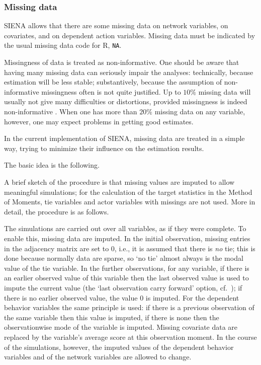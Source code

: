 \documentclass[a4paper,fleqn,11pt]{article}
\newcommand{\+}{\, + \,}
\newcommand{\Rn}{{\sf R}}
\newcommand{\SI}{{\sf SIENA }}
\newcommand{\si}{{\sf SIENA}}
\begin{document}
\subsubsection{Missing data}
\label{S_missing}

\SI allows that there are some missing data on network variables,
on covariates, and on dependent action
variables.  Missing data must be indicated by
the usual missing data code for \Rn, \texttt{NA}.

Missingness of data is treated as non-informative.
One should be aware that having many missing data can seriously
impair the analyses: technically, because estimation will be
less stable; substantively, because the assumption of
non-informative missingness often is not quite justified.
Up to $10\%$ missing data will usually not give many difficulties
or distortions, provided missingness is indeed non-informative
\citep{HuismanSteglich08}.
When one has more than $20\%$ missing data on any variable, however,
one may expect problems in getting good estimates.

In the current implementation of \si, missing data are treated in
a simple way, trying to minimize their influence on the estimation
results.

The basic idea is the following.
\medskip

A brief sketch of the procedure is that
missing values are imputed to allow meaningful simulations;
for the calculation of the target statistics in the Method of Moments,
tie variables and actor variables with missings are not
used.
More in detail, the procedure is as follows.

The simulations are carried out over all variables,
as if they were complete.
To enable this, missing data are imputed.
In the initial observation, missing entries in the adjacency
matrix are set to 0,
i.e., it is assumed that there is \emph{no} tie;
this is done because normally data are sparse, so `no tie'
almost always is the modal value of the tie variable.
In the further observations, for any variable,
if there is an earlier observed value of this variable then
the last observed value is used to impute the current
value (the `last observation carry forward' option,
cf.\ \citet{Lepkowski89}); if there is no earlier observed
value, the value 0 is imputed.
For the dependent behavior variables the same principle
is used: if there is a previous observation of the same variable
then this value is imputed, if there is none then the
observationwise mode of the variable is imputed.
Missing covariate data are replaced by the
variable's average score at this observation moment. In the course
of the simulations, however, the imputed values of the dependent
behavior variables and of the network variables are allowed to
change.
\end{document}
